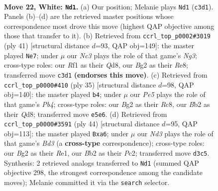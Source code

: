 \documentclass[11pt]{article}
\begin{document}
\clearpage

\begin{figure}[p]\centering
\begin{subfigure}{0.46\textwidth}\centering
\resizebox{\linewidth}{!}{%
\newchessgame
\chessboard[
  setfen={r3qrk1/6b1/1pn5/p1p1Ppnp/2P3b1/1PNN4/PBQP2B1/1R3RK1 w - - 0 22},
  showmover=false,
  pgfstyle=straightmove, color=movearrow, markmove={c3-d1}
]}
\caption{}
\end{subfigure}\hfill
\begin{subfigure}{0.46\textwidth}\centering
\resizebox{\linewidth}{!}{%
\newchessgame
\chessboard[
  setfen={1r1qrbk1/3b1pp1/pp1p1nnp/3P4/P5P1/4BNNP/1P3PB1/R2QR1K1 b - - 0 21},
  showmover=false,
  pgfstyle=straightmove, color=movearrow, markmove={g6-e7}
]}
\caption{}
\end{subfigure}
\\[4pt]
\begin{subfigure}{0.46\textwidth}\centering
\resizebox{\linewidth}{!}{%
\newchessgame
\chessboard[
  setfen={2rq1rk1/p2b2p1/3bpnBp/1p1p4/3P4/2N1BP2/PP4PP/2RQ1RK1 b - - 0 18},
  showmover=false,
  pgfstyle=straightmove, color=movearrow, markmove={b5-b4}
]}
\caption{}
\end{subfigure}\hfill
\begin{subfigure}{0.46\textwidth}\centering
\resizebox{\linewidth}{!}{%
\newchessgame
\chessboard[
  setfen={2rqr1k1/b4pp1/p3bnnp/3p4/8/P1NB1NBP/2PQ1PP1/1R2R1K1 w - - 0 23},
  showmover=false,
  pgfstyle=straightmove, color=movearrow, markmove={d3-a6}
]}
\caption{}
\end{subfigure}
\caption{\textbf{Move 22, White: \texttt{Nd1}.} (a) Our position; Melanie plays \texttt{Nd1} (\texttt{c3d1}). Panels (b)--(d) are the retrieved master positions whose correspondence most drove this move (highest QAP objective among those that transfer to it). (b) Retrieved from \texttt{ccrl\_top\_p0002\#3019} (ply 41) [structural distance $d$=93, QAP obj=149]: the master played \texttt{Ne7}; under $\mu$ our \emph{Nc3} plays the role of that game's \emph{Ng3}; cross-type roles: our \emph{R}f1 as their \emph{Q}d8, our \emph{B}g2 as their \emph{R}e8; transferred move \texttt{c3d1} \textbf{(endorses this move)}. (c) Retrieved from \texttt{ccrl\_top\_p0000\#410} (ply 35) [structural distance $d$=98, QAP obj=140]: the master played \texttt{b4}; under $\mu$ our \emph{Pe5} plays the role of that game's \emph{Pb4}; cross-type roles: our \emph{B}g2 as their \emph{R}c8, our \emph{B}b2 as their \emph{Q}d8; transferred move \texttt{e5e6}. (d) Retrieved from \texttt{ccrl\_top\_p0000\#3591} (ply 44) [structural distance $d$=95, QAP obj=113]: the master played \texttt{Bxa6}; under $\mu$ our \emph{Nd3} plays the role of that game's \emph{Bd3} (a \textbf{cross-type} correspondence); cross-type roles: our \emph{B}g2 as their \emph{R}e1, our \emph{B}b2 as their \emph{P}c2; transferred move \texttt{d3c5}. Synthesis: 2 retrieved analogs transferred to \texttt{Nd1} (summed QAP objective 298, the strongest correspondence among the candidate moves); Melanie committed it via the \texttt{search} selector.}
\label{fig:thought-m42}
\end{figure}
\end{document}
